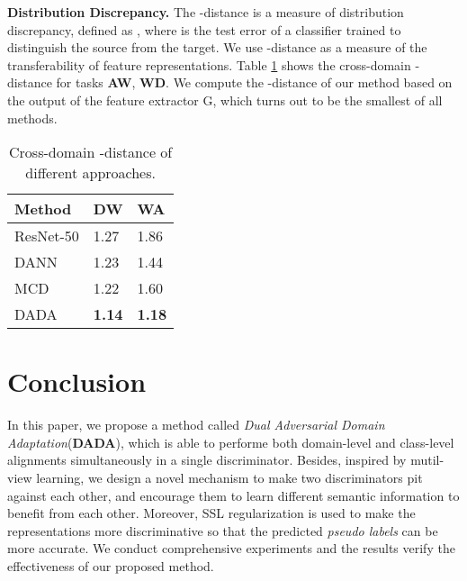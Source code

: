 \documentclass{ecai}
\begin{document}
\textbf{Distribution Discrepancy.} The -distance is a measure of distribution discrepancy, defined as , where  is the test error of a classifier trained to distinguish the source from the target. We use -distance as a measure of the transferability of feature representations. Table \ref{A-distance} shows the cross-domain -distance for tasks \textbf{A}\textbf{W}, \textbf{W}\textbf{D}. We compute the -distance of our method based on the output of the feature extractor G, which turns out to be the smallest of all methods.

\begin{table}
\centering
\caption{Cross-domain -distance of different approaches.}
\begin{tabular}{lp{2.0cm}<{\centering}p{2.0cm}<{\centering}}
\toprule
Method&   DW&   WA\\
\midrule
ResNet-50\cite{b36}&  1.27&   1.86\\
DANN\cite{b18}&       1.23&   1.44\\
MCD\cite{b24}&        1.22&   1.60\\
DADA&     \textbf{1.14}& \textbf{1.18}\\
\bottomrule
\end{tabular}
\label{A-distance}
\end{table}


\section{Conclusion}
In this paper, we propose a method called {\emph{Dual Adversarial Domain Adaptation}}(\textbf{DADA}), which is able to performe both domain-level and class-level alignments simultaneously in a single discriminator.  Besides, inspired by mutil-view learning, we design a  novel mechanism to make  two discriminators pit against each other, and encourage them to learn  different semantic information to benefit from each other.  Moreover, SSL regularization is used to make the representations more discriminative so that the predicted {\emph{pseudo labels}} can be more accurate.  We conduct comprehensive experiments and the results verify the effectiveness of our proposed method.



\end{document}
